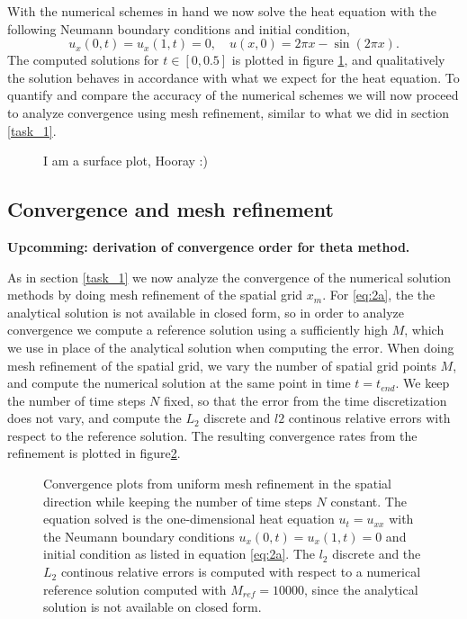 With the numerical schemes in hand we now solve the heat equation with the following Neumann boundary conditions and initial condition, 
\begin{equation}
    u_x(0,t) = u_x(1,t) = 0, \quad u(x,0) = 2\pi x - \sin(2\pi x). 
    \label{eq:2a}
\end{equation}
The computed solutions for $t \in [0, 0.5]$ is plotted in figure \ref{fig:task2-surface}, 
and qualitatively the solution behaves in accordance with what we expect for the heat equation. 
To quantify and compare the accuracy of the numerical schemes we will now proceed to analyze convergence using mesh refinement, 
similar to what we did in section \ref{task_1}. 

\begin{figure}
    
    \caption{I am a surface plot, Hooray :)}
    \label{fig:task2-surface}
\end{figure}

\subsection{Convergence and mesh refinement}
\textbf{Upcomming: derivation of convergence order for theta method.}

As in section \ref{task_1} we now analyze the convergence of the numerical solution methods 
by doing mesh refinement of the spatial grid $x_m$. 
For \eqref{eq:2a}, the the analytical solution is not available in closed form, 
so in order to analyze convergence we compute a reference solution using a sufficiently high $M$, 
which we use in place of the analytical solution when computing the error. 
When doing mesh refinement of the spatial grid, 
we vary the number of spatial grid points $M$, 
and compute the numerical solution at the same point in time $t=t_{end}$. 
We keep the number of time steps $N$ fixed, 
so that the error from the time discretization does not vary, 
and compute the $L_2$ discrete and $l2$ continous relative errors with respect to the reference solution. 
The resulting convergence rates from the refinement is plotted in figure\ref{fig:2a-convergence}. 
\begin{figure}[ht]
    \centering
    
    \label{fig:2a-convergence}
    \caption{
        Convergence plots from uniform mesh refinement 
        in the spatial direction while keeping the number of time steps $N$ constant. 
        The equation solved is the one-dimensional heat equation $u_t=u_{xx}$ 
        with the Neumann boundary conditions $u_x(0,t) = u_x(1,t)=0$ and initial condition 
        as listed in equation \eqref{eq:2a}. 
        The $l_2$ discrete and the $L_2$ continous relative errors is computed 
        with respect to a numerical reference solution computed with $M_{ref}=10000$, 
        since the analytical solution is not available on closed form. 
    }
\end{figure}

